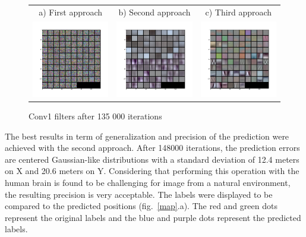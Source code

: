 \begin{figure}[htb]
\centering
\begin{tabular}{ccc}
    a) First approach & b) Second approach & c) Third approach \\
    \includegraphics[width=0.3\linewidth]{images/regression/conv1_26_135000}&
    \includegraphics[width=0.3\linewidth]{images/regression/conv1_37_135000}&
    \includegraphics[width=0.3\linewidth]{images/regression/conv1_30_135000}\\
\end{tabular}
\caption{Conv1 filters after 135 000 iterations}
\label{1appfilter}
\label{2appfilter}
\label{3appfilter}
\end{figure}

The best results in term of generalization and precision of the prediction were achieved with the second approach. After 148000 iterations, the prediction errors are centered Gaussian-like distributions with a standard deviation of 12.4 meters on X and 20.6 meters on Y. Considering that performing this operation with the human brain is found to be challenging for image from a natural environment, the resulting precision is very acceptable. The labels were displayed to be compared to the predicted positions (fig.~\ref{map}.a). The red and green dots represent the original labels and the blue and purple dots represent the predicted labels.


